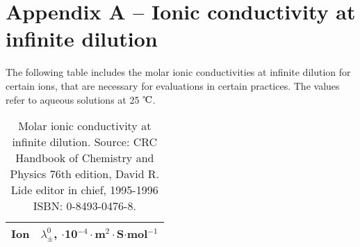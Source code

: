 \fancyhead[LO,RE]{\thesection}
\fancyfoot[LE,RO]{\thepage}

\section*{Appendix A -- Ionic conductivity at infinite dilution}
The following table includes the molar ionic conductivities at infinite dilution for certain ions, that are necessary for evaluations in certain practices. The values refer to aqueous solutions at 25 $\celsius$.

\begin{table}[h!]
\centering
\caption{Molar ionic conductivity at infinite dilution. Source: CRC Handbook of Chemistry and Physics 76th edition, David R. Lide editor in chief, 1995-1996 ISBN: 0-8493-0476-8.}
\label{table:conductivities}
\vspace{5mm}
\begin{tabular}{l|c}
                        Ion \hspace{2cm} & $\lambda^0_\pm$, $\cdot$10$^{-4}\cdot$m$^2 \cdot$S$\cdot$mol$^{-1}$\\
                      \hline



\end{tabular}
\end{table}
